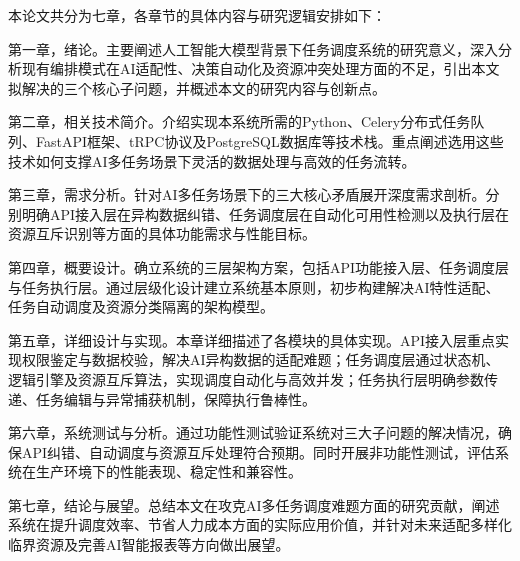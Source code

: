 本论文共分为七章，各章节的具体内容与研究逻辑安排如下：

第一章，绪论。主要阐述人工智能大模型背景下任务调度系统的研究意义，深入分析现有编排模式在AI适配性、决策自动化及资源冲突处理方面的不足，引出本文拟解决的三个核心子问题，并概述本文的研究内容与创新点。

第二章，相关技术简介。介绍实现本系统所需的Python、Celery分布式任务队列、FastAPI框架、tRPC协议及PostgreSQL数据库等技术栈。重点阐述选用这些技术如何支撑AI多任务场景下灵活的数据处理与高效的任务流转。

第三章，需求分析。针对AI多任务场景下的三大核心矛盾展开深度需求剖析。分别明确API接入层在异构数据纠错、任务调度层在自动化可用性检测以及执行层在资源互斥识别等方面的具体功能需求与性能目标。

第四章，概要设计。确立系统的三层架构方案，包括API功能接入层、任务调度层与任务执行层。通过层级化设计建立系统基本原则，初步构建解决AI特性适配、任务自动调度及资源分类隔离的架构模型。

第五章，详细设计与实现。本章详细描述了各模块的具体实现。API接入层重点实现权限鉴定与数据校验，解决AI异构数据的适配难题；任务调度层通过状态机、逻辑引擎及资源互斥算法，实现调度自动化与高效并发；任务执行层明确参数传递、任务编辑与异常捕获机制，保障执行鲁棒性。

第六章，系统测试与分析。通过功能性测试验证系统对三大子问题的解决情况，确保API纠错、自动调度与资源互斥处理符合预期。同时开展非功能性测试，评估系统在生产环境下的性能表现、稳定性和兼容性。

第七章，结论与展望。总结本文在攻克AI多任务调度难题方面的研究贡献，阐述系统在提升调度效率、节省人力成本方面的实际应用价值，并针对未来适配多样化临界资源及完善AI智能报表等方向做出展望。

